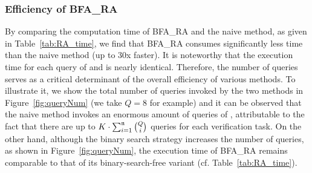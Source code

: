 \subsubsection{Efficiency of {\sf BFA\_RA}}
By comparing the computation time of {\sf BFA\_RA} and the naive method, as given in Table~\ref{tab:RA_time}, we find that {\sf BFA\_RA} consumes significantly less time than the naive method (up to 30x faster). It is noteworthy that the execution time for each query of \deepPoly and \symPoly is nearly identical. Therefore, the number of queries serves as a critical determinant of the overall efficiency of various methods. To illustrate it, we show the total number of queries invoked by the two methods in Figure~\ref{fig:queryNum} (we take $Q=8$ for example) and it can be observed that the naive method invokes an enormous amount of queries of \deepPoly, attributable to the fact that there are up to $K\cdot\sum_{i=1}^{\mathfrak{n}}{Q \choose i}$ queries for each verification task.
On the other hand, although the binary search strategy  increases the number of \symPoly queries, as shown in Figure~\ref{fig:queryNum}, the execution time of {\sf BFA\_RA} remains comparable to that of its binary-search-free variant (cf. Table~\ref{tab:RA_time}). 




\vspace{1mm}
\noindent
\setlength{\fboxsep}{3pt}%
\setlength{\fboxrule}{1pt}%






